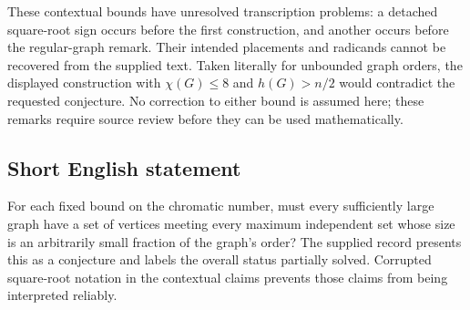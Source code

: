 \documentclass[11pt]{article}
\begin{document}
These contextual bounds have unresolved transcription problems: a detached square-root sign occurs before the first construction, and another occurs before the regular-graph remark. Their intended placements and radicands cannot be recovered from the supplied text. Taken literally for unbounded graph orders, the displayed construction with \(\chi(G)\le8\) and \(h(G)>n/2\) would contradict the requested conjecture. No correction to either bound is assumed here; these remarks require source review before they can be used mathematically.
\subsection{Short English statement}
For each fixed bound on the chromatic number, must every sufficiently large graph have a set of vertices meeting every maximum independent set whose size is an arbitrarily small fraction of the graph's order? The supplied record presents this as a conjecture and labels the overall status partially solved. Corrupted square-root notation in the contextual claims prevents those claims from being interpreted reliably.
\end{document}
